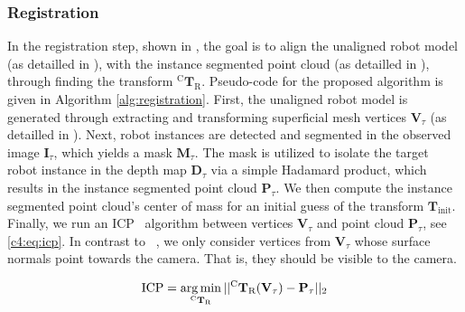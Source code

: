 \subsubsection{Registration}
\label{c4:sec:registration}
In the registration step, shown in , the goal is to align the unaligned robot model (as detailled in ), with the instance segmented point cloud (as detailled in ), through finding the transform $^\text{C}\mathbf{T}_\text{R}$. Pseudo-code for the proposed algorithm is given in Algorithm \ref{alg:registration}.
First, the unaligned robot model is generated through extracting and transforming superficial mesh vertices $\mathbf{V}_\tau$ (as detailled in ).
Next, robot instances are detected and segmented in the observed image $\mathbf{I}_\tau$, which yields a mask $\mathbf{M}_\tau$.
The mask is utilized to isolate the target robot instance in the depth map $\mathbf{D}_\tau$ via a simple Hadamard product, which results in the instance segmented point cloud $\mathbf{P}_\tau$.
We then compute the instance segmented point cloud's center of mass for an initial guess of the transform $\mathbf{T}_\text{init}$. Finally, we run an ICP~\citep{simple_icp} algorithm between vertices $\mathbf{V}_\tau$ and point cloud $\mathbf{P}_\tau$, see \eqref{c4:eq:icp}. In contrast to ~\citep{simple_icp}, we only consider vertices from $\mathbf{V}_\tau$ whose surface normals point towards the camera. That is, they should be visible to the camera.

\begin{equation}
    \label{c4:eq:icp}
    \text{ICP} = \argmin_{^\text{C}\mathbf{T}_\text{R}} || ^\text{C}\mathbf{T}_\text{R}(\mathbf{V}_\tau) - \mathbf{P}_\tau||_2
\end{equation}

